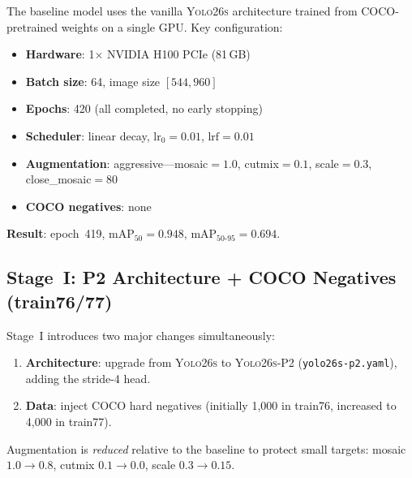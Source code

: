 \documentclass[12pt, titlepage]{article}
\begin{document}
The baseline model uses the vanilla \textsc{Yolo26s} architecture trained from
COCO-pretrained weights on a single GPU. Key configuration:

\begin{itemize}[leftmargin=*, itemsep=2pt]
  \item \textbf{Hardware}: 1$\times$ NVIDIA H100 PCIe (81\,GB)
  \item \textbf{Batch size}: 64, image size $[544, 960]$
  \item \textbf{Epochs}: 420 (all completed, no early stopping)
  \item \textbf{Scheduler}: linear decay, $\text{lr}_0 = 0.01$,
        $\text{lrf} = 0.01$
  \item \textbf{Augmentation}: aggressive---mosaic$=1.0$,
        cutmix$=0.1$, scale$=0.3$, close\_mosaic$=80$
  \item \textbf{COCO negatives}: none
\end{itemize}

\noindent\textbf{Result}: epoch~419, mAP$_{50} = 0.948$,
mAP$_{50\text{-}95} = 0.694$.

\subsection{Stage~I: P2 Architecture + COCO Negatives (train76/77)}
\label{sec:stage1}

Stage~I introduces two major changes simultaneously:

\begin{enumerate}[leftmargin=*]
  \item \textbf{Architecture}: upgrade from \textsc{Yolo26s} to \textsc{Yolo26s-P2}
        (\texttt{yolo26s-p2.yaml}), adding the stride-4 head.
  \item \textbf{Data}: inject COCO hard negatives (initially 1{,}000
        in train76, increased to 4{,}000 in train77).
\end{enumerate}

\noindent Augmentation is \emph{reduced} relative to the baseline to
protect small targets: mosaic $1.0 \to 0.8$, cutmix
$0.1 \to 0.0$, scale $0.3 \to 0.15$.
\end{document}
